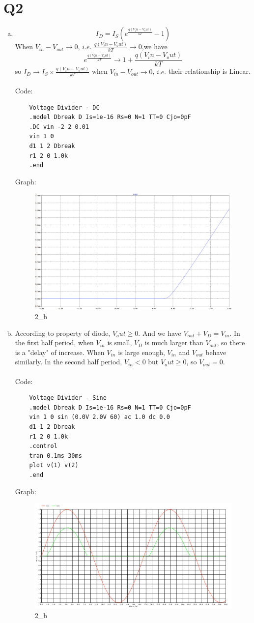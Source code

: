\documentclass{article}
\begin{document}
\section*{Q2}
\begin{enumerate}[(a)]
	\item 
	$$I_D=I_S(e^\frac{q(V_in-V_out)}{kT}-1)$$
	When $V_{in}-V_{out}\rightarrow0$, $i.e.$ $\frac{q(V_in-V_out)}{kT}\rightarrow0$,we have
	$$e^\frac{q(V_in-V_out)}{kT}\rightarrow1+\frac{q(V_in-V_out)}{kT}$$
	so $I_D\rightarrow I_S\times \frac{q(V_in-V_out)}{kT}$ when $V_{in}-V_{out}\rightarrow0$, $i.e.$ their relationship is Linear.\\\\	
	Code: 
	\begin{lstlisting}
	Voltage Divider - DC
	.model Dbreak D Is=1e-16 Rs=0 N=1 TT=0 Cjo=0pF
	.DC vin -2 2 0.01
	vin 1 0
	d1 1 2 Dbreak
	r1 2 0 1.0k
	.end
	\end{lstlisting}
	Graph: 
	\begin{figure}[H]
		\centering 
		\includegraphics [width=0.8\linewidth]{2_a.png}
		\caption{2\_b}
	\end{figure}
\newpage
	\item 
	According to property of diode, $V_out\geq0$. And we have $V_{out} + V_D = V_{in}$. In the first half period, when $V_{in}$ is small, $V_D$ is much larger than $V_{out}$, so there is a "delay" of increase. When $V_{in}$ is large enough, $V_{in}$ and $V_{out}$ behave similarly. In the second half period, $V_{in} <0$ but $V_out\geq0$, so $V_{out}=0$.\\\\
	Code: 
	\begin{lstlisting}
	Voltage Divider - Sine
	.model Dbreak D Is=1e-16 Rs=0 N=1 TT=0 Cjo=0pF
	vin 1 0 sin (0.0V 2.0V 60) ac 1.0 dc 0.0
	d1 1 2 Dbreak
	r1 2 0 1.0k
	.control
	tran 0.1ms 30ms
	plot v(1) v(2)
	.end
	\end{lstlisting}
	Graph: 
	\begin{figure}[H]
		\centering 
		\includegraphics [width=0.8\linewidth]{2_b.pdf}
		\caption{2\_b}
	\end{figure}
\end{enumerate}
\end{document}

